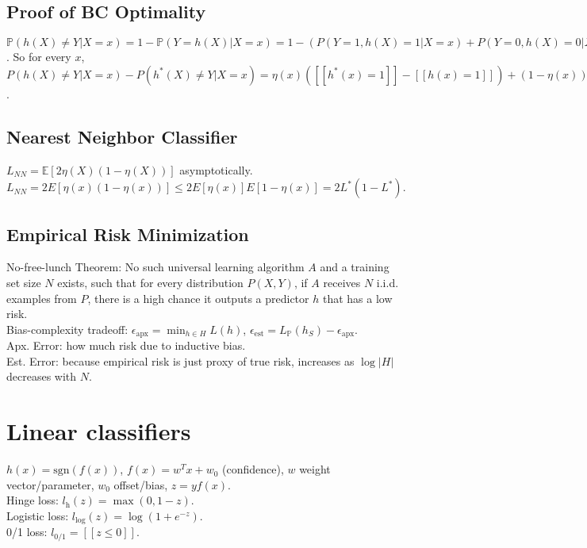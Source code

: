 \subsection*{Proof of BC Optimality}

\begin{mdframed}
$\mathbb{P}(h(X) \neq Y | X = x) = 1 - \mathbb{P}(Y = h(X)|X=x) = 1 - (P(Y=1,h(X)=1|X=x) + P(Y=0,h(X)=0|X=x)) = 1 - ([[h(x)=1]]P(Y=1|X=x) + [[h(x)=0]]P(Y=0|X=x)) = 1 - ([[h(x)=1]]\eta(x) + [[h(x)=0]](1-\eta(x)))$. So for every $x$, $P(h(X) \neq Y|X=x) - P(h^*(X) \neq Y | X=x) = \eta(x)([[h^*(x)=1]] - [[h(x)=1]]) + (1-\eta(x))([[h^*(x)=0]]-[[h(x)=0]]) = (2\eta(x) - 1)([[h^*(x)=1]]-[[h(x)=1]]) \geq 0$.
\end{mdframed}

\subsection*{Nearest Neighbor Classifier}

$L_{NN} = \mathbb{E}[2\eta(X)(1-\eta(X))]$ asymptotically.\\
$L_{NN} = 2E[\eta(x)(1-\eta(x))] \leq 2E[\eta(x)]E[1-\eta(x)] = 2L^*(1-L^*)$.

\subsection*{Empirical Risk Minimization}

No-free-lunch Theorem: No such universal learning algorithm $A$ and a training set size $N$ exists, such that for every distribution $P(X,Y)$, if $A$ receives $N$ i.i.d. examples from $P$, there is a high chance it outputs a predictor $h$ that has a low risk.\\
Bias-complexity tradeoff: $\epsilon_{\text{apx}} = \min_{h \in H}L(h)$, $\epsilon_{\text{est}} = L_\mathbb{P}(h_S) - \epsilon_{\text{apx}}$.\\
Apx. Error: how much risk due to inductive bias.\\
Est. Error: because empirical risk is just proxy of true risk, increases as $\log |H|$ decreases with $N$.

\section{Linear classifiers}

$h(x) = \text{sgn}(f(x))$, $f(x) = w^T x + w_0$ (confidence), $w$ weight vector/parameter, $w_0$ offset/bias, $z = yf(x)$.\\
Hinge loss: $l_{\text{h}}(z) = \max(0, 1-z)$.\\
Logistic loss: $l_{\log}(z) = \log(1+e^{-z})$.\\
0/1 loss: $l_{\text{0/1}} = [[z \leq 0]]$.

